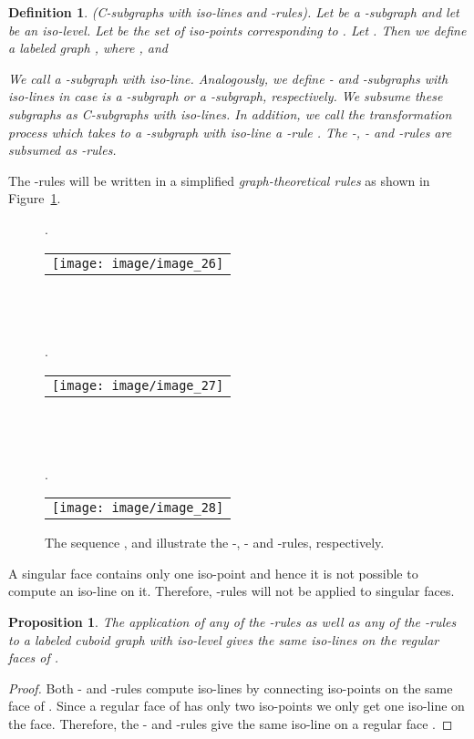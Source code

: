 \documentclass[a4paper,11pt]{article}
\newtheorem{proposition}[theorem]{Proposition}
\newtheorem{definition}[theorem]{Definition}
\begin{document}
\begin{definition}(C-subgraphs with iso-lines and -rules).
Let  be a -subgraph and let  be an iso-level.
Let  be the set of iso-points
corresponding to . Let .
Then we define a labeled graph , where
,  and

We call  a -subgraph with iso-line. Analogously, we define - and
-subgraphs with iso-lines in case  is a -subgraph or a -subgraph, respectively.
We subsume these subgraphs as C-subgraphs with iso-lines. In addition, we call the transformation
process which takes  to a -subgraph with iso-line a -rule . The -, -
and -rules are subsumed as -rules.
\label{def:iso-path-23}
\end{definition}
\noindent The -rules will be written in a simplified {\it graph-theoretical rules} as shown in
Figure~\ref{image_26_27_28}.
\begin{figure}[!ht]
.
\begin{tabular}[c]{l}
\texttt{[image: image/image\_26]}
\end{tabular}\\ \\ \\

.
\begin{tabular}[c]{l}
\texttt{[image: image/image\_27]}
\end{tabular}\\ \\ \\

.
\begin{tabular}[c]{l}
\texttt{[image: image/image\_28]}
\end{tabular}
\caption{The sequence ,  and  illustrate the -, - and -rules, respectively.}
\label{image_26_27_28}
\end{figure}
\FloatBarrier
{}A singular face contains only one iso-point and hence it is not possible
to compute an iso-line on it. Therefore, -rules will not be applied to singular faces.
\begin{proposition}
The application of any of the  -rules as well as any of the -rules to a labeled cuboid
graph  with iso-level  gives the same iso-lines on the
regular faces of .
\label{prop:iso-path-2}
\end{proposition}
\begin{proof}
Both - and -rules compute iso-lines by connecting iso-points on the same
face of . Since a regular face of  has only two iso-points
we only get one iso-line on the face. Therefore, the - and -rules give the same
iso-line on a regular face .
\end{proof}
\end{document}
